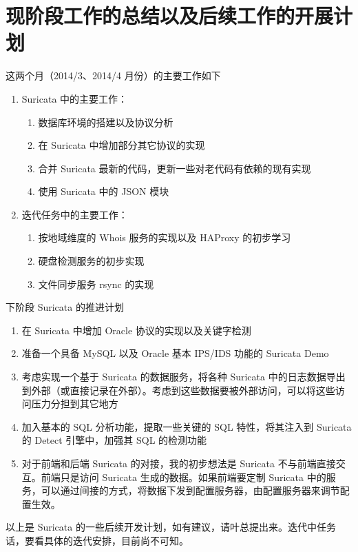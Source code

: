 \documentclass{article}
\begin{document}
\section{现阶段工作的总结以及后续工作的开展计划}
这两个月（2014/3、2014/4 月份）的主要工作如下

\begin{enumerate}
    \item Suricata 中的主要工作：
        \begin{enumerate}
            \item 数据库环境的搭建以及协议分析
            \item 在 Suricata 中增加部分其它协议的实现
            \item 合并 Suricata 最新的代码，更新一些对老代码有依赖的现有实现
            \item 使用 Suricata 中的 JSON 模块
        \end{enumerate}

    \item 迭代任务中的主要工作：
    
        \begin{enumerate}
            \item 按地域维度的 Whois 服务的实现以及 HAProxy 的初步学习
            \item 硬盘检测服务的初步实现
            \item 文件同步服务 rsync 的实现
        \end{enumerate}
\end{enumerate}

下阶段 Suricata 的推进计划

\begin{enumerate}
    \item 在 Suricata 中增加 Oracle 协议的实现以及关键字检测
    \item 准备一个具备 MySQL 以及 Oracle 基本 IPS/IDS 功能的 Suricata Demo
    \item 考虑实现一个基于 Suricata 的数据服务，将各种 Suricata 中的日志数据导出到外部（或直接记录在外部）。考虑到这些数据要被外部访问，可以将这些访问压力分担到其它地方
    \item 加入基本的 SQL 分析功能，提取一些关键的 SQL 特性，将其注入到 Suricata 的 Detect 引擎中，加强其 SQL 的检测功能
    \item 对于前端和后端 Suricata 的对接，我的初步想法是 Suricata 不与前端直接交互。前端只是访问 Suricata 生成的数据。如果前端要定制 Suricata 中的服务，可以通过间接的方式，将数据下发到配置服务器，由配置服务器来调节配置生效。
\end{enumerate}

以上是 Suricata 的一些后续开发计划，如有建议，请叶总提出来。迭代中任务话，要看具体的迭代安排，目前尚不可知。
\end{document}

